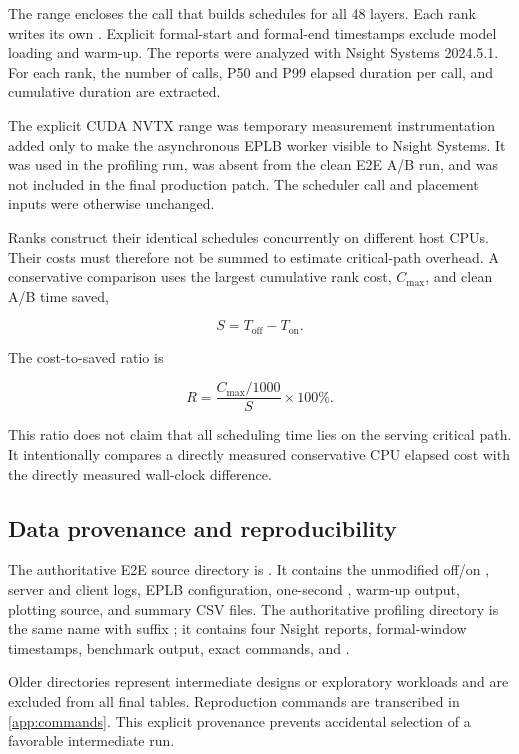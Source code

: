 The range  encloses the call that builds
schedules for all 48 layers. Each rank writes its own .
Explicit formal-start and formal-end timestamps exclude model loading and
warm-up. The reports were analyzed with Nsight Systems 2024.5.1. For each rank,
the number of calls, P50 and P99 elapsed duration per call, and cumulative
duration are extracted.

The explicit CUDA NVTX range was temporary measurement instrumentation added
only to make the asynchronous EPLB worker visible to Nsight Systems. It was
used in the profiling run, was absent from the clean E2E A/B run, and was not
included in the final production patch. The scheduler call and placement
inputs were otherwise unchanged.

Ranks construct their identical schedules concurrently on different host
CPUs. Their costs must therefore not be summed to estimate critical-path
overhead. A conservative comparison uses the largest cumulative rank cost,
$C_{\max}$, and clean A/B time saved,

\begin{equation}
  S=T_{\mathrm{off}}-T_{\mathrm{on}}.
\end{equation}

The cost-to-saved ratio is

\begin{equation}
  R=\frac{C_{\max}/1000}{S}\times100\%.
  \label{eq:cost-ratio}
\end{equation}

This ratio does not claim that all scheduling time lies on the serving critical
path. It intentionally compares a directly measured conservative CPU elapsed
cost with the directly measured wall-clock difference.

\subsection{Data provenance and reproducibility}

The authoritative E2E source directory is
. It contains the
unmodified off/on , server and client logs, EPLB
configuration, one-second , warm-up output, plotting source, and
summary CSV files. The authoritative profiling directory is the same name with
suffix ; it contains four Nsight reports, formal-window
timestamps, benchmark output, exact commands, and .

Older directories represent intermediate designs or exploratory workloads and
are excluded from all final tables. Reproduction commands are transcribed in
\cref{app:commands}. This explicit provenance prevents accidental selection of
a favorable intermediate run.
